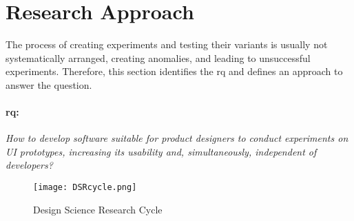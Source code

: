 \section{Research Approach}  %
\label{introduction:section:research}
The process of creating experiments and testing their variants is usually not systematically arranged, creating anomalies, and leading to unsuccessful experiments.
Therefore, this section identifies the \ac{rq} and defines an approach to answer the question.

\paragraph{\ac{rq}:} \textit{How to develop software suitable for product designers to conduct experiments on UI prototypes, increasing its usability and, simultaneously, independent of developers?}\\

\begin{figure}[ht]
    \centering
    \texttt{[image: DSRcycle.png]}
    \caption[Design Science Research Cycle]{Design Science Research Cycle \cite{paper:designprinciple:vk}}
    \label{intro:fig:dps}
\end{figure}

